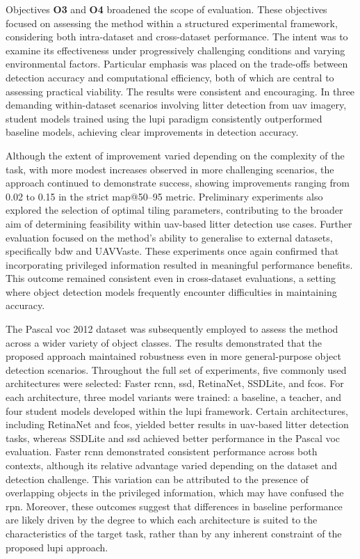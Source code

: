Objectives \textbf{O3} and \textbf{O4} broadened the scope of evaluation. These objectives focused on assessing the method within a structured experimental framework, considering both intra-dataset and cross-dataset performance. The intent was to examine its effectiveness under progressively challenging conditions and varying environmental factors. Particular emphasis was placed on the trade-offs between detection accuracy and computational efficiency, both of which are central to assessing practical viability. The results were consistent and encouraging. In three demanding within-dataset scenarios involving litter detection from \gls{uav} imagery, student models trained using the \gls{lupi} paradigm consistently outperformed baseline models, achieving clear improvements in detection accuracy.

Although the extent of improvement varied depending on the complexity of the task, with more modest increases observed in more challenging scenarios, the approach continued to demonstrate success, showing improvements ranging from 0.02 to 0.15 in the strict \gls{map}@50--95 metric. Preliminary experiments also explored the selection of optimal tiling parameters, contributing to the broader aim of determining feasibility within \gls{uav}-based litter detection use cases. Further evaluation focused on the method’s ability to generalise to external datasets, specifically \gls{bdw} and UAVVaste. These experiments once again confirmed that incorporating privileged information resulted in meaningful performance benefits. This outcome remained consistent even in cross-dataset evaluations, a setting where object detection models frequently encounter difficulties in maintaining accuracy.

The Pascal \gls{voc} 2012 dataset was subsequently employed to assess the method across a wider variety of object classes. The results demonstrated that the proposed approach maintained robustness even in more general-purpose object detection scenarios. Throughout the full set of experiments, five commonly used architectures were selected: Faster \gls{rcnn}, \gls{ssd}, RetinaNet, SSDLite, and \gls{fcos}. For each architecture, three model variants were trained: a baseline, a teacher, and four student models developed within the \gls{lupi} framework. Certain architectures, including RetinaNet and \gls{fcos}, yielded better results in \gls{uav}-based litter detection tasks, whereas SSDLite and \gls{ssd} achieved better performance in the Pascal \gls{voc} evaluation. Faster \gls{rcnn} demonstrated consistent performance across both contexts, although its relative advantage varied depending on the dataset and detection challenge. This variation can be attributed to the presence of overlapping objects in the privileged information, which may have confused the \gls{rpn}. Moreover, these outcomes suggest that differences in baseline performance are likely driven by the degree to which each architecture is suited to the characteristics of the target task, rather than by any inherent constraint of the proposed \gls{lupi} approach.

